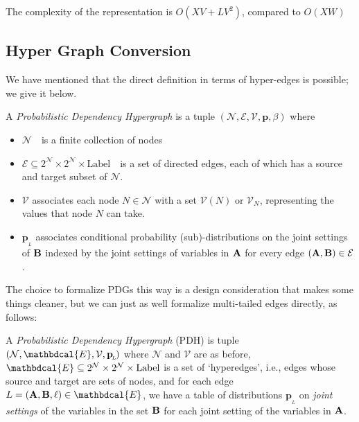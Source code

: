 \documentclass[letterpaper]{article} %
\theoremstyle{plain}
\theoremstyle{definition}
\theoremstyle{remark}
\newcommand{\note}[1]{{\color{blue}\ \!\Large\smash{\textbf{[}}{\normalsize\textsc{note:} #1}\ \!\smash{\textbf{]}}}}
\newcommand\mat[1]{\mathbf{#1}}
\newcommand{\bp}[1][L]{\mat{p}_{\!_{#1}\!}}
\newcommand{\V}{\mathcal V}
\newcommand{\N}{\mathcal N}
\newcommand{\Ed}{\mathcal E}
\newcommand{\pdgvars}[1][]{(\N#1, \Ed#1, \V#1, \mat p#1, \beta#1)}
\begin{document}
{{The complexity of the representation is $O(XV + L V^2)$, compared to $O(XW)$}

\subsection{Hyper Graph Conversion}\label{sec:hyper-convert}
We have mentioned that the direct definition in terms of hyper-edges is possible; we give it below.

\begin{defn}[PDH]\label{def:hypermodel}
	A \emph{Probabilistic Dependency Hypergraph} is a tuple $\pdgvars[]$ where
	\begin{itemize}[nosep]
		\item $\N$~~is a finite collection of nodes
		\item $\Ed \subseteq 2^{\N} \times 2^{\N} \times \mathrm{Label}$~~is a set of directed edges, each of which has a source and target subset of $\N$.
		\item $\V$ associates each node $N \in \mathcal N$ with a set $\V(N)$ or $\V_N$, representing the values that node $N$ can take.
		\item $\bp$
		associates conditional probability (sub)-distributions on the joint settings of $\bf B$ indexed by the joint settings of variables in $\bf A$ for every edge $({\bf A,B}) \in \Ed$. %
	\end{itemize}
\end{defn}

	
The choice to formalize PDGs this way is a design consideration that makes some things cleaner, but we can just as well formalize multi-tailed edges directly, as follows:

\begin{defn}[PDH]\label{def:modelhyper}
A \textit{Probabilistic Dependency Hypergraph} (PDH) is tuple $(\N,
\mathbdcal{E}, \V, \bp)$ where $\N$ and $\V$ are as before, $\mathbdcal{E}
\subseteq 2^\N \times 2^\N \times \mathrm{Label}$ is a set of `hyperedges',
i.e., edges whose source and target are sets of nodes, and for each edge $L
= ({\bf A, B}, \ell) \in \mathbdcal{E}$, we have a table of distributions
$\bp$ on \emph{joint settings} of the variables in the set $\bf B$ for each
joint setting of the variables in $\bf A$.
\end{defn}

}
\end{document}
